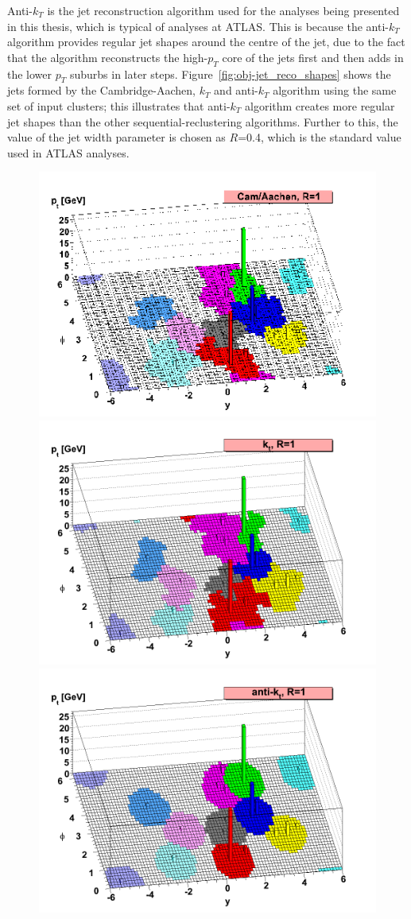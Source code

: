 Anti-$k_T$ is the jet reconstruction algorithm used for the analyses being presented in this thesis, which is typical of analyses at ATLAS.
This is because the anti-$k_T$ algorithm provides regular jet shapes around the centre of the jet,
due to the fact that the algorithm reconstructs the high-$p_T$ core of the jets first and then adds in the lower $p_T$ suburbs in later steps.
Figure~\ref{fig:obj-jet_reco_shapes} shows the jets formed by the Cambridge-Aachen, $k_T$ and anti-$k_T$ algorithm using the same set of input clusters;
this illustrates that anti-$k_T$ algorithm creates more regular jet shapes than the other sequential-reclustering algorithms.
Further to this, the value of the jet width parameter is chosen as $R$=0.4, which is the standard value used in ATLAS analyses.

\begin{figure}[!ht]
  \captionsetup[subfigure]{aboveskip=-5pt,justification=centering}
  \begin{center}
     {
      \includegraphics[width=0.45\linewidth, angle=0]{figs/Objects/jet_reco_shapes_ca.png}
    }
     {
      \includegraphics[width=0.45\linewidth, angle=0]{figs/Objects/jet_reco_shapes_kt.png}
    }\\
     {
      \includegraphics[width=0.45\linewidth, angle=0]{figs/Objects/jet_reco_shapes_akt.png}
    }


\end{center}
\end{figure}
